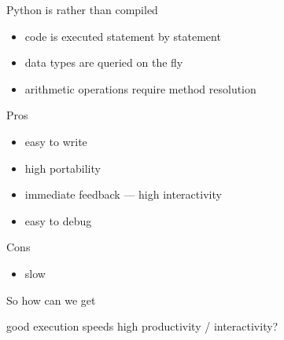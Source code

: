 \begin{frame}
    
    Python is  rather than compiled

    \vspace{0.5em}
    \begin{itemize}
        \item code is executed statement by statement
    \vspace{0.5em}
        \item data types are queried on the fly
    \vspace{0.5em}
        \item arithmetic operations require method resolution
    \end{itemize}

\end{frame}

\begin{frame}

    Pros

    \begin{itemize}
        \item easy to write
        \item high portability
        \item immediate feedback --- high interactivity
        \item easy to debug
    \end{itemize}

    \vspace{0.5em}

    Cons

    \begin{itemize}
        \item slow
    \end{itemize}

\end{frame}


\begin{frame}
    
    So how can we get 

    \begin{center}
    good execution speeds  high productivity / interactivity?
    \end{center}

\end{frame}

